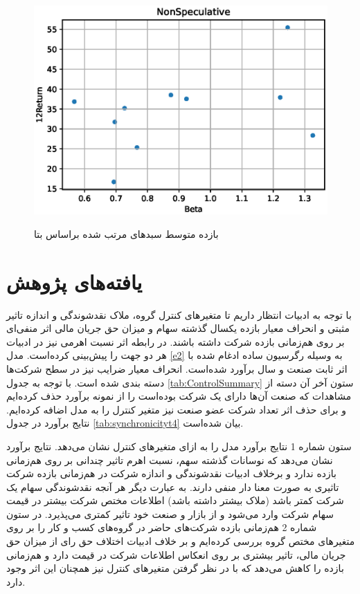 \documentclass[12pt, a4paper]{article}
\begin{document}
\begin{figure}[htbp]
\centering
\caption{بازده متوسط سبد‌های مرتب شده براساس بتا}
\includegraphics[width=0.7\linewidth]{NonSpeculativeBetaReturn10.eps}
\label{fig:NonSpeculativeBetaReturn10}
\end{figure}




  \FloatBarrier
\section{یافته‌های پژوهش}

با توجه به ادبیات انتظار داریم تا متغیر‌های کنترل گروه، ملاک نقدشوندگی و اندازه تاثیر مثبتی و  انحراف معیار بازده  یکسال گذشته سهام و میزان حق جریان مالی اثر منفی‌ای بر روی هم‌زمانی بازده شرکت داشته باشند. در رابطه اثر نسبت اهرمی نیز در ادبیات هر دو جهت را پیش‌بینی کرده‌است.
 مدل 
\ref{e2}
به وسیله رگرسیون ساده ادغام شده 
با اثر ثابت صنعت و سال برآورد شده‌است. انحراف معیار ضرایب نیز در سطح شرکت‌ها دسته بندی شده است. با توجه به جدول 
\ref{tab:ControlSummary}
ستون آخر آن دسته از مشاهدات که صنعت آن‌ها دارای یک شرکت بوده‌است را از نمونه  برآورد حذف کرده‌ایم و برای حذف اثر تعداد شرکت عضو صنعت نیز متغیر کنترل 
 را به مدل اضافه کرده‌ایم.
 نتایج برآورد در جدول 
\ref{tab:synchronicityt4}
بیان شده‌است.

ستون شماره 1 نتایج برآورد مدل را به ازای متغیر‌های کنترل نشان می‌دهد. نتایج برآورد نشان می‌دهد که نوسانات گذشته سهم، نسبت اهرم تاثیر چندانی بر روی هم‌زمانی بازده ندارد و برخلاف ادبیات نقدشوندگی و اندازه شرکت در هم‌زمانی بازده شرکت تاثیری به صورت معنا دار منفی دارند. به عبارت دیگر هر آنجه نقدشوندگی سهام یک شرکت کمتر باشد (ملاک 
بیشتر داشته باشد) اطلاعات مختص شرکت بیشتر در قیمت سهام شرکت وارد می‌شود و از بازار و صنعت خود تاثیر کمتری می‌پذیرد. 
در ستون شماره 2 هم‌زمانی بازده شرکت‌های حاضر در گروه‌های کسب و کار را بر روی متغیر‌های مختص گروه بررسی کرده‌ایم و بر خلاف ادبیات اختلاف حق رای از میزان حق  جریان مالی، تاثیر بیشتری بر روی انعکاس اطلاعات شرکت در قیمت دارد و هم‌زمانی بازده را کاهش می‌دهد که با در نظر گرفتن متغیر‌های کنترل نیز همچنان این اثر وجود دارد.
\end{document}
